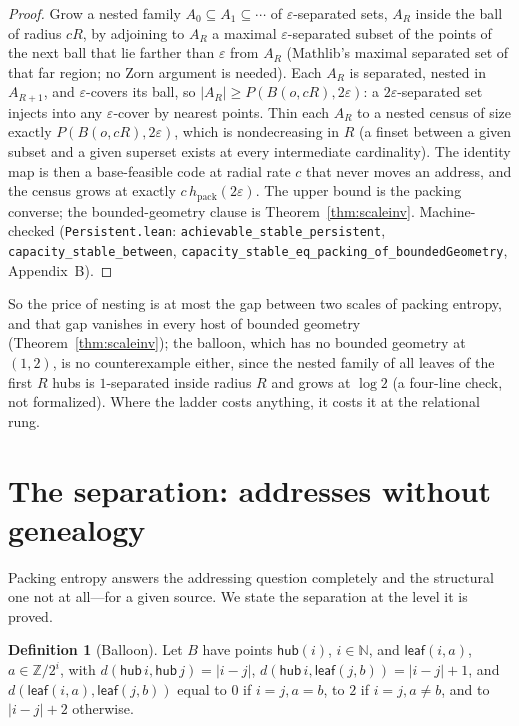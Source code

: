 \documentclass[11pt,reqno]{amsart}
\theoremstyle{plain}
\theoremstyle{definition}
\newtheorem{definition}[theorem]{Definition}
\newcommand{\hpack}{h_{\mathrm{pack}}}
\newcommand{\eps}{\varepsilon}
\begin{document}
\begin{proof}
Grow a nested family $A_0\subseteq A_1\subseteq\cdots$ of $\eps$-separated sets, $A_R$ inside the ball of radius $cR$, by adjoining to $A_R$ a maximal $\eps$-separated subset of the points of the next ball that lie farther than $\eps$ from $A_R$ (Mathlib's maximal separated set of that far region; no Zorn argument is needed). Each $A_R$ is separated, nested in $A_{R+1}$, and $\eps$-covers its ball, so $|A_R|\ge P(B(o,cR),2\eps)$: a $2\eps$-separated set injects into any $\eps$-cover by nearest points. Thin each $A_R$ to a nested census of size exactly $P(B(o,cR),2\eps)$, which is nondecreasing in $R$ (a finset between a given subset and a given superset exists at every intermediate cardinality). The identity map is then a base-feasible code at radial rate $c$ that never moves an address, and the census grows at exactly $c\,\hpack(2\eps)$. The upper bound is the packing converse; the bounded-geometry clause is Theorem~\ref{thm:scaleinv}. Machine-checked (\texttt{Persistent.lean}: \texttt{achievable\_\allowbreak{}stable\_\allowbreak{}persistent}, \texttt{capacity\_\allowbreak{}stable\_\allowbreak{}between}, \texttt{capacity\_\allowbreak{}stable\_\allowbreak{}eq\_\allowbreak{}packing\_\allowbreak{}of\_\allowbreak{}boundedGeometry}, Appendix~B).
\end{proof}

So the price of nesting is at most the gap between two scales of packing entropy, and that gap vanishes in every host of bounded geometry (Theorem~\ref{thm:scaleinv}); the balloon, which has no bounded geometry at $(1,2)$, is no counterexample either, since the nested family of all leaves of the first $R$ hubs is $1$-separated inside radius $R$ and grows at $\log2$ (a four-line check, not formalized). Where the ladder costs anything, it costs it at the relational rung.

\section{The separation: addresses without genealogy}\label{sec:balloon}

Packing entropy answers the addressing question completely and the structural one not at all---for a given source. We state the separation at the level it is proved.

\begin{definition}[Balloon]
Let $B$ have points $\mathsf{hub}(i)$, $i\in\mathbb N$, and $\mathsf{leaf}(i,a)$, $a\in\mathbb Z/2^i$, with $d(\mathsf{hub}\,i,\mathsf{hub}\,j)=|i-j|$, $d(\mathsf{hub}\,i,\mathsf{leaf}(j,b))=|i-j|+1$, and $d(\mathsf{leaf}(i,a),\mathsf{leaf}(j,b))$ equal to $0$ if $i=j,a=b$, to $2$ if $i=j,a\ne b$, and to $|i-j|+2$ otherwise.
\end{definition}
\end{document}
